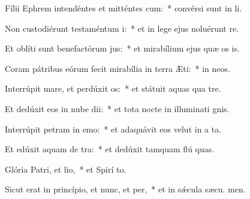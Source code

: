 \item Fílii Ephrem intendéntes et mitténtes cum:~* convérsi sunt in  li.
\item Non custodiérunt testaméntum i:~* et in lege ejus noluérunt re.
\item Et oblíti sunt benefactórum jus:~* et mirabílium ejus quæ os is.
\item Coram pátribus eórum fecit mirabília in terra Æti:~* in  neos.
\item Interrúpit mare, et perdúxit os:~* et státuit aquas qua  tre.
\item Et dedúxit eos in nube dii:~* et tota nocte in illuminati gnis.
\item Interrúpit petram in emo:~* et adaquávit eos velut in a ta.
\item Et edúxit aquam de tra:~* et dedúxit tamquam flú quas.
\item Glória Patri, et lio,~* et Spirí to.
\item Sicut erat in princípio, et nunc, et per,~* et in sǽcula sæcu. men.
